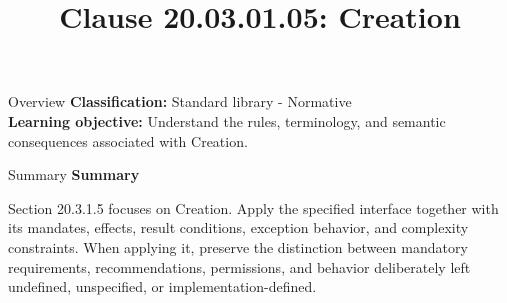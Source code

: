 \documentclass[10pt,letterpaper]{article}
\title{Clause 20.03.01.05: Creation}
\author{}
\date{}
\begin{document}
\maketitle
\begin{CornellOverviewBox}{Overview}
\textbf{Classification:} Standard library - Normative\\[2pt]
\textbf{Learning objective:} Understand the rules, terminology, and semantic consequences associated with Creation.
\end{CornellOverviewBox}\begin{CornellSummaryBox}{Summary}
{\sffamily\bfseries\color{Accent} Summary}\par\vspace{3pt}Section 20.3.1.5 focuses on Creation. Apply the specified interface together with its mandates, effects, result conditions, exception behavior, and complexity constraints. When applying it, preserve the distinction between mandatory requirements, recommendations, permissions, and behavior deliberately left undefined, unspecified, or implementation-defined.
\end{CornellSummaryBox}
\end{document}
